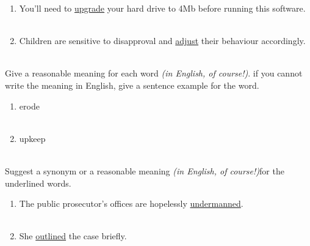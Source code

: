 \documentclass{exam}
\begin{document}
\begin{questions}
\begin{enumerate}
	\item You'll need to \underline{upgrade} your hard drive to 4Mb before running this software.\\ \\
	\item Children are sensitive to disapproval and \underline{adjust} their behaviour accordingly.\\ \\
\end{enumerate}
\question Give a reasonable meaning for each word \emph{(in English, of course!)}. if you cannot write the meaning in English, give a sentence example for the word.\\
\begin{enumerate}
	\item erode \\ \\ 
	\item upkeep \\ \\
\end{enumerate}
\question Suggest a synonym or a reasonable meaning \emph{(in English, of course!)}for the underlined words.\\
\begin{enumerate}
	\item The public prosecutor's offices are hopelessly \underline{undermanned}.\\ \\
	\item She \underline{outlined} the case briefly.\\\\
\end{enumerate}
\end{questions}
\end{document}
